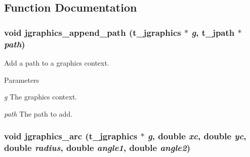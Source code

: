 \subsection{Function Documentation}
\hypertarget{group__jgraphics_ga4e16e3a3ce6cc21374ba3d7ae4615f65}{
\subsubsection[{jgraphics\_\-append\_\-path}]{\setlength{\rightskip}{0pt plus 5cm}void jgraphics\_\-append\_\-path ({\bf t\_\-jgraphics} $\ast$ {\em g}, \/  {\bf t\_\-jpath} $\ast$ {\em path})}}
\label{group__jgraphics_ga4e16e3a3ce6cc21374ba3d7ae4615f65}


Add a path to a graphics context. 
\begin{DoxyParams}{Parameters}
\item[{\em g}]The graphics context. \item[{\em path}]The path to add. \end{DoxyParams}
\hypertarget{group__jgraphics_gaeee1dd41f67614a31307cc006f4f39ce}{
\subsubsection[{jgraphics\_\-arc}]{\setlength{\rightskip}{0pt plus 5cm}void jgraphics\_\-arc ({\bf t\_\-jgraphics} $\ast$ {\em g}, \/  double {\em xc}, \/  double {\em yc}, \/  double {\em radius}, \/  double {\em angle1}, \/  double {\em angle2})}}
\label{group__jgraphics_gaeee1dd41f67614a31307cc006f4f39ce}


